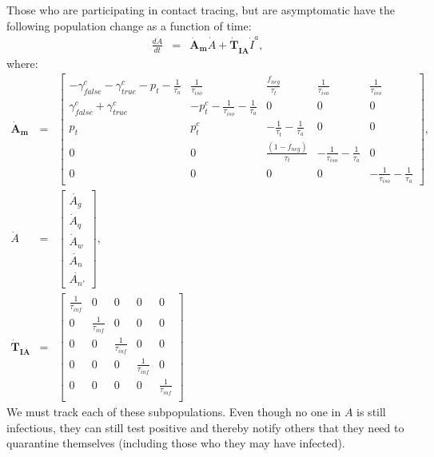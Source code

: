 \documentclass[notitlepage, superscriptaddress]{revtex4-2}
\begin{document}
Those who are participating in contact tracing, but are asymptomatic have the following population change as a function of time:
\begin{eqnarray}
\frac{d\dot{A}}{dt} &=& \boldsymbol{\dot{A}_{m}}  \dot{A} + \boldsymbol{\dot{T}_{\dot{I}\dot{A}}}  \dot{I}^{a}, 
\end{eqnarray}
where:
%
\begin{eqnarray}
\boldsymbol{\dot{A}_{m}}&=&
\begin{bmatrix}
 -\gamma^{c}_{false} -\gamma^{c}_{true} - p_{t} -\frac{1}{\tau_{a}} & \frac{1}{\tau_{iso}}  & \frac{f_{neg}}{\tau_{t}} & \frac{1}{\tau_{iso}} & \frac{1}{\tau_{iso}} \\
\gamma^{c}_{false} + \gamma^{c}_{true}    &  -p^{c}_{t}  - \frac{1}{\tau_{iso}} - \frac{1}{\tau_{a}}      &  0    & 0  & 0\\
p_{t}     &  p^{c}_{t}                  &  -\frac{1}{\tau_{t}}  - \frac{1}{\tau_{a}}  & 0 & 0\\
0 & 0 & \frac{(1-f_{neg})}{\tau_{t}}  & -\frac{1}{\tau_{iso}}  -  \frac{1}{\tau_{a}} & 0 \\ 
0 & 0 & 0 & 0 & -\frac{1}{\tau_{iso}}  -  \frac{1}{\tau_{a}}
\end{bmatrix}, \\ 
%
\dot{A} &=& 
\begin{bmatrix}
\dot{A_{g}} \\ \dot{A}_{q} \\ \dot{A}_{w}\\ \dot{A_{n}} \\ \dot{A_{n'}}
\end{bmatrix}, \\ 
%
% 
\boldsymbol{\dot{T}_{\dot{I}\dot{A}}} &=&
\begin{bmatrix}
\frac{1}{\tau_{inf}}  & 0                 & 0 & 0 & 0\\ 
 0          &  \frac{1}{\tau_{inf}}  & 0 & 0 & 0 \\ 
 0          & 0                 &  \frac{1}{\tau_{inf}} & 0 & 0 \\ 
0           & 0                 &  0 & \frac{1}{\tau_{inf}} & 0 \\ 
0           & 0                 &  0 & 0 & \frac{1}{\tau_{inf}} \\
\end{bmatrix}
\end{eqnarray}
We must track each of these subpopulations. Even though no one in $A$ is still infectious, they can still test positive and thereby notify others that they need to quarantine themselves (including those who they may have infected). 
\end{document}
